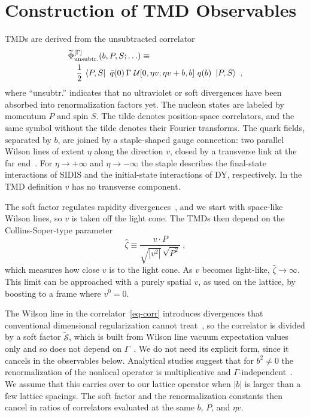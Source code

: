 \documentclass[aps,prd,twocolumn,amsmath,amssymb,floatfix]{revtex4-2}
\newcommand{\tcdot}{{\cdot}}
\newcommand{\bvec}{b}
\newcommand{\zetahat}{{\hat \zeta}}
\newcommand{\unsub}{\text{unsubtr.}}
\newcommand{\softf}{\mathcal{S}}
\newcommand{\Wline}[1]{\ensuremath{{\mathcal{U}}[#1]}}
\begin{document}
\section{Construction of TMD Observables}
\label{sec:construction}
TMDs are derived from the unsubtracted correlator
\begin{align}
	&\widetilde \Phi_\unsub^{[\Gamma]}(\bvec,P,S;\ldots) \equiv \nonumber\\
	&\quad \frac{1}{2}\, \bra{P,S}\ \bar{q}(0)\, \Gamma\ \Wline{0,\eta v,\eta v+\bvec,\bvec}\ q(\bvec)\ \ket{P,S}\ ,
	\label{eq-corr}
\end{align}
where ``unsubtr.'' indicates that no ultraviolet or soft divergences have been absorbed into renormalization factors yet. The nucleon states are labeled by momentum $P$ and spin $S$. The tilde denotes position-space correlators, and the same symbol without the tilde denotes their Fourier transforms. The quark fields, separated by $\bvec$, are joined by a staple-shaped gauge connection: two parallel Wilson lines of extent $\eta$ along the direction $v$, closed by a transverse link at the far end~\cite{Musch:2011er}. For $\eta\to+\infty$ and $\eta\to-\infty$ the staple describes the final-state interactions of SIDIS and the initial-state interactions of DY, respectively. In the TMD definition $v$ has no transverse component.

The soft factor regulates rapidity divergences~\cite{Collins:1981uk,Aybat:2011ge}, and we start with space-like Wilson lines, so $v$ is taken off the light cone. The TMDs then depend on the Collins-Soper-type parameter
\begin{equation}
	\zetahat \equiv \frac{v \tcdot P}{\sqrt{|v^2|}\,\sqrt{P^2}}\ ,
	\label{eq-zeta}
\end{equation}
which measures how close $v$ is to the light cone. As $v$ becomes light-like, $\zetahat\to\infty$. This limit can be approached with a purely spatial $v$, as used on the lattice, by boosting to a frame where $v^0=0$.

The Wilson line in the correlator~\eqref{eq-corr} introduces divergences that conventional dimensional regularization cannot treat~\cite{Musch:2011er}, so the correlator is divided by a soft factor $\widetilde{\softf}$, which is built from Wilson line vacuum expectation values only and so does not depend on $\Gamma$~\cite{Musch:2011er,Aybat:2011zv,CollinsBook2011}. We do not need its explicit form, since it cancels in the observables below. Analytical studies suggest that for $\bvec^2\neq0$ the renormalization of the nonlocal operator is multiplicative and $\Gamma$-independent~\cite{Musch:2011er,Yoon:2017qzo}. We assume that this carries over to our lattice operator when $|\bvec|$ is larger than a few lattice spacings. The soft factor and the renormalization constants then cancel in ratios of correlators evaluated at the same $\bvec$, $P$, and $\eta v$.
\end{document}
